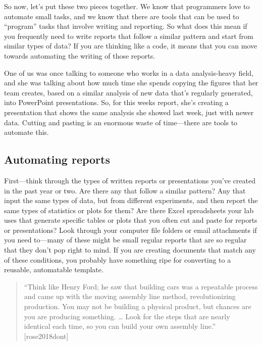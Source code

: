 \documentclass[]{tufte-book}
\begin{document}
So now, let's put these two pieces together. We know that programmers love to
automate small tasks, and we know that there are tools that can be used to
``program'' tasks that involve writing and reporting. So what does this mean if
you frequently need to write reports that follow a similar pattern and start
from similar types of data? If you are thinking like a code, it means that
you can move towards automating the writing of those reports.

One of us was once talking to someone who works in a data analysis-heavy field,
and she was talking about how much time she spends copying the figures that her
team creates, based on a similar analysis of new data that's regularly
generated, into PowerPoint presentations. So, for this weeks report, she's
creating a presentation that shows the same analysis she showed last week, just
with newer data. Cutting and pasting is an enormous waste of time---there are
tools to automate this.

\hypertarget{automating-reports}{%
\subsection{Automating reports}\label{automating-reports}}

First---think through the types of written reports or presentations you've
created in the past year or two. Are there any that follow a similar pattern?
Any that input the same types of data, but from different experiments, and then
report the same types of statistics or plots for them? Are there Excel
spreadsheets your lab uses that generate specific tables or plots that you often
cut and paste for reports or presentations? Look through your computer file
folders or email attachments if you need to---many of these might be small
regular reports that are so regular that they don't pop right to mind. If you
are creating documents that match any of these conditions, you probably have
something ripe for converting to a reusable, automatable template.

\begin{quote}
``Think like Henry Ford; he saw that building cars was a repeatable process and
came up with the moving assembly line method, revolutionizing production. You
may not be building a physical product, but chances are you are producing something.
\ldots{} Look for the steps that are nearly identical each time, so you can build your
own assembly line.'' {[}rose2018dont{]}
\end{quote}
\end{document}
